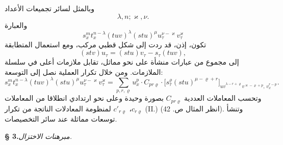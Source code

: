 \documentclass[11pt]{article}
\begin{document}
وبالمثل لسائر تجميعات الأعداد
\[\lambda,n;\varkappa,\nu.\]
والعبارة
\[s_x^m t_x^{n-\lambda}(tuv)^\lambda(stu)^\mu u_\tau^{\nu-\varkappa}v_\tau^\varkappa\]
تكون، إذن، قد ردت إلى شكل قطبي مركب، ومع استعمال المتطابقة
\[
(stv)u_\tau=(stu)v_\tau-s_\tau(tuv),
\]
إلى مجموع من عبارات منشأة على نحو مماثل، تقابل ملازمات أعلى في سلسلة الملازمات.
ومن خلال تكرار العملية نصل إلى التوسعة:
\[
\tag{III}
s_x^m t_x^{n-\lambda}(tuv)^\lambda(stu)^\mu u_\tau^{\nu-\varkappa}v_\tau^\varkappa
=
\sum_{p,r,\varrho}u_x^p\cdot C_{pr\varrho}\cdot
\bigl[s_\tau^\varrho(stu)^{\mu-\varrho+r}\bigr]_{\widehat{uv}^{\lambda-r+\varrho}v^{\varkappa-\varrho+p},\,v_x^{r-p}}.
\]
وتحسب المعاملات العددية $C_{pr\varrho}$ بصورة وحيدة وعلى نحو ارتدادي انطلاقا من المعاملات $c_{r\varrho}$، $c'_{r\varrho}$ لمنظومة المعادلات الناتجة من تكرار (II.) (انظر المثال ص. 42). وتنشأ توسعات مماثلة عند سائر التخصيصات.
\begin{center}
\textbf{§ 3.}\quad \emph{مبرهنات الاختزال.}
\end{center}
\end{document}
